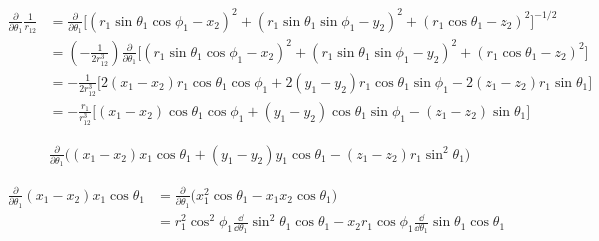 \begin{align*}
    \frac{\partial}{\partial\theta_1} \frac{1}{r_{12}}
    &= \frac{\partial}{\partial\theta_1} \Big[ (r_1\sin\theta_1\cos\phi_1 - x_2)^2 + (r_1\sin\theta_1\sin\phi_1 - y_2)^2 + (r_1\cos\theta_1 - z_2)^2 \Big]^{-1/2} \\
    &= \left(-\frac{1}{2r_{12}^3}\right) \frac{\partial}{\partial\theta_1} \Big[ (r_1\sin\theta_1\cos\phi_1 - x_2)^2 + (r_1\sin\theta_1\sin\phi_1 - y_2)^2 + (r_1\cos\theta_1 - z_2)^2 \Big] \\
    &= -\frac{1}{2r_{12}^3} \Big[ 2(x_1-x_2)r_1\cos\theta_1\cos\phi_1 + 2(y_1-y_2)r_1\cos\theta_1\sin\phi_1 - 2(z_1-z_2)r_1\sin\theta_1 \Big] \\
    &= -\frac{r_1}{r_{12}^3} \Big[ (x_1-x_2)\cos\theta_1\cos\phi_1 + (y_1-y_2)\cos\theta_1\sin\phi_1 - (z_1-z_2)\sin\theta_1 \Big]
\end{align*}

\begin{align*}
    &\frac{\partial}{\partial \theta_1}\Big( (x_1 - x_2)x_1\cos\theta_1 + (y_1-y_2)y_1\cos\theta_1 - (z_1-z_2)r_1\sin^2\theta_1 \Big)
\end{align*}

\begin{align*}
    \frac{\partial}{\partial \theta_1} (x_1 - x_2)x_1\cos\theta_1
    &= \frac{\partial}{\partial \theta_1} \Big(x_1^2\cos\theta_1 - x_1x_2\cos\theta_1\Big) \\
    &= r_1^2\cos^2\phi_1\frac{\dd}{\dd \theta_1} \sin^2\theta_1\cos\theta_1 - x_2r_1\cos\phi_1\frac{\dd}{\dd \theta_1} \sin\theta_1\cos\theta_1 \\
\end{align*}

